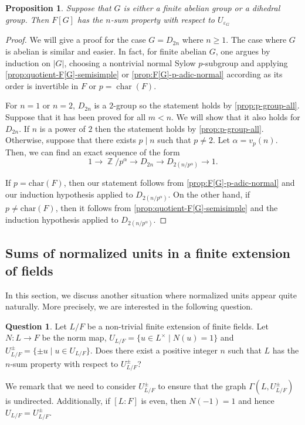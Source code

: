 \documentclass[11pt, a4paper]{amsart}
\newtheorem{prop}[thm]{Proposition}
\theoremstyle{definition}
\newtheorem{question}[thm]{Question}
\DeclareMathOperator{\Z}{\mathbb{Z}}
\numberwithin{equation}{section}
\begin{document}
\begin{prop}
Suppose that $G$ is either a finite abelian group or a dihedral group. Then $F[G]$ has the $n$-sum property with respect to $U_{\varepsilon_{G}}$
\end{prop}


\begin{proof}
We will give a proof for the case $G=D_{2n}$ where $n \geq 1.$ The case where $G$ is abelian is similar and easier. In fact, for finite abelian \(G\), one argues by induction on \(|G|\), choosing a nontrivial normal Sylow $p$-subgroup and applying \cref{prop:quotient-F[G]-semisimple} or \cref{prop:F[G]-p-adic-normal} according as its order is invertible in \(F\) or  \(p= \operatorname{char}(F)\). 


For $n=1$ or $n=2$, $D_{2n}$ is a $2$-group so the statement holds by \cref{prop:p-group-all}. Suppose that it has been proved for all $m <n$. We will show that it also holds for $D_{2n}.$ If $n$ is a power of $2$ then the statement holds by \cref{prop:p-group-all}. Otherwise, suppose that there exists $p \mid n$ such that $p \neq 2.$ Let $\alpha=v_p(n).$ Then, we can find an exact sequence of the form 
\[ 1 \to \Z/p^{\alpha} \to D_{2n} \to D_{2(n/p^{\alpha})} \to 1.\]

If $p=\text{char}(F)$, then our statement follows from \cref{prop:F[G]-p-adic-normal} and our induction hypothesis applied to $D_{2(n/p^{\alpha})}$. On the other hand, if $p \neq \text{char}(F)$, then it follows from \cref{prop:quotient-F[G]-semisimple} and the induction hypothesis applied to $D_{2(n/p^{\alpha})}.$
\end{proof}




\subsection{Sums of normalized units in a finite extension of fields}
In this section, we discuss another situation where normalized units appear quite naturally. More precisely, we are interested in the following question. 


\begin{question} \label{question:normalized-units}
    Let $L/F$ be a non-trivial finite extension of finite fields. Let $N: L \to F$ be the norm map, $U_{L/F}= \{u \in L^{\times} \mid N(u)=1 \}$ and $U_{L/F}^{\pm} = \{ \pm{u} \mid u \in U_{L/F} \}.$ Does there exist a positive integer $n$ such that $L$ has the $n$-sum property with respect to $U_{L/F}^{\pm}$?
\end{question}
We remark that we need to consider $U_{L/F}^{\pm}$ to ensure that the graph $\Gamma(L, U_{L/F}^{\pm})$ is undirected. Additionally, if $[L:F]$ is even, then $N(-1)=1$ and hence $U_{L/F}= U_{L/F}^{\pm}.$
\end{document}
